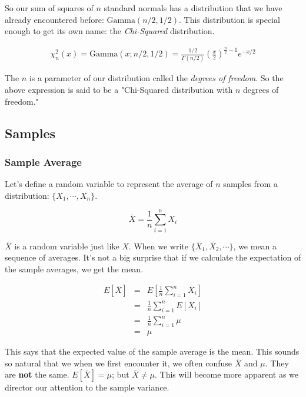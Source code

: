 \documentclass[]{article}
\begin{document}
So our sum of squares of $n$ standard normals has a distribution
that we have already encountered before: $\mbox{Gamma}(n/2, 1/2)$.
This distribution is special enough to get its own name:
the \emph{Chi-Squared} distribution.

\begin{eqnarray} \label{chisq_density}
\chi_n^2(x) = \mbox{Gamma}(x; n/2, 1/2) = \frac{1/2}{\Gamma(n/2)} 
     \left( \frac{x}{2} \right)^{\frac{n}{2}-1} e^{- x/2}
\end{eqnarray}

The $n$ is a parameter of our distribution called the
\emph{degrees of freedom}.  So the above expression is
said to be a 
"Chi-Squared distribution with $n$ degrees of freedom."

\subsection{Samples}



\subsubsection{Sample Average}

Let's define a random variable to represent the average of
$n$ samples from a distribution: $\{X_1, \cdots , X_n\}$.

\begin{equation}
\bar{X} = \frac{1}{n} \sum_{i=1}^n X_i
\end{equation}

$\bar{X}$ is a random variable just like $X$.  When we
write $\{\bar{X}_1, \bar{X}_2, \cdots\}$, we mean a sequence
of averages.  It's not a big surprise that if we calculate the
expectation of the sample averages, we get the mean.

\begin{eqnarray*}
E[\bar{X}] &= & E \left[ \frac{1}{n} \sum_{i=1}^n X_i \right] \\
  &= & \frac{1}{n} \sum_{i=1}^n E \left[ X_i \right] \\
  &= & \frac{1}{n} \sum_{i=1}^n \mu \\
  &= & \mu 
\end{eqnarray*}

This says that the expected value of the sample average is
the mean.  This sounds so natural that we when we first
encounter it, we often confuse $\bar{X}$ and $\mu$.  They
are \textbf{not} the same.  $E[\bar{X}] = \mu$; but
$\bar{X} \ne \mu$.  This will become more apparent as we
director our attention to the sample variance.
\end{document}
